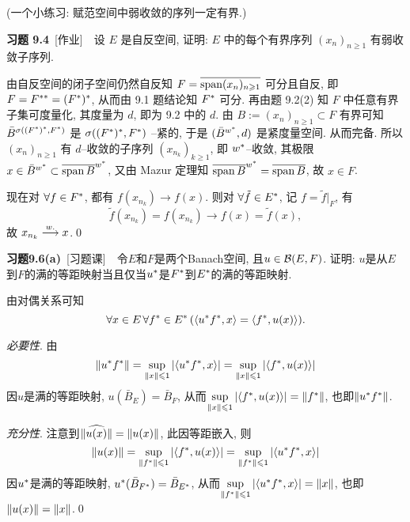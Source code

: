 	(一个小练习: 赋范空间中弱收敛的序列一定有界.)

	\textbf{习题 9.4}\ [作业]\ \ 设 $ E $ 是自反空间, 证明: $ E $ 中的每个有界序列 $ (x_{n})_{n\geqslant1} $ 有弱收敛子序列.
	\begin{Proof}
		由自反空间的闭子空间仍然自反知 $ F=\overline{\operatorname{span}(x_{n})_{n\geqslant1}} $ 可分且自反, 即 $ F=F^{**}=(F^{*})^{*} $, 从而由 9.1 题结论知 $ F^{*} $ 可分. 再由题 9.2(2) 知 $ F $ 中任意有界子集可度量化, 其度量为 $ d $, 即为 9.2 中的 $ d $. 由 $ B:=(x_{n})_{n\geqslant1}\subset F $ 有界可知 $ \bar{B}^{\sigma((F^{*})^{*}, F^{*})} $ 是 $ \sigma((F^{*})^{*}, F^{*}) $ --紧的, 于是 $ (\bar{B}^{w^{*}}, d) $ 是紧度量空间. 从而完备. 所以 $ (x_{n})_{n\geqslant1} $ 有 $ d $--收敛的子序列 $ (x_{n_{k}})_{k\geqslant1} $, 即 $ w^{*} $--收敛, 其极限 $ x\in\bar{B}^{w^{*}}\subset\overline{\operatorname{span} B}^{w^{*}} $, 又由 Mazur 定理知 $ \overline{\operatorname{span} B}^{w^{*}}=\overline{\operatorname{span} B} $, 故 $ x\in F $.

		现在对 $ \forall f\in F^{*} $, 都有 $  f(x_{n_{k}})\to f(x) $. 则对 $ \forall \tilde{f}\in E^{*} $, 记 $ f = \tilde{f}|_{F} $, 有
		\[
			\tilde{f}(x_{n_{k}})=f(x_{n_{k}})\to f(x)=\tilde{f}(x),
		\]
		故 $ x_{n_{k}}\overset{w.}{\longrightarrow} x $.\qed
	\end{Proof}
	
	\textbf{习题9.6(a)}\ [习题课]\ \ 令$ E $和$ F $是两个Banach空间, 且$ u\in\mathcal{B}(E,F) $. 证明: $ u $是从$ E $到$ F $的满的等距映射当且仅当$ u^{*} $是$ F^{*} $到$ E^{*} $的满的等距映射.
	\begin{Proof}
	由对偶关系可知
	\[
	\forall x\in E\,\forall f^{*}\in E^{*}\,(\left\langle u^{*}f^{*},x \right\rangle=\left\langle f^{*},u(x) \right\rangle).
	\]
	
	\textsl{必要性}. 由
	\[
	\left\| u^{*}f^{*} \right\|=\sup_{\left\| x \right\|\leqslant 1}\left| \left\langle u^{*}f^{*},x \right\rangle \right| =\sup_{\left\| x \right\|\leqslant 1}\left| \left\langle f^{*},u(x) \right\rangle \right| 
	\]
	因$ u $是满的等距映射, $ u(\bar{B}_E)=\bar{B}_F $, 从而$ \sup\limits_{\left\| x \right\|\leqslant 1}\left| \left\langle f^{*},u(x) \right\rangle \right| =\left\| f^{*} \right\| $, 也即$ \left\| u^{*}f^{*} \right\| $.
	
	\textsl{充分性}. 注意到$ \lVert \widehat{u(x)}\rVert=\left\| u(x) \right\| $, 此因等距嵌入, 则
	\[
	\left\| u(x) \right\|=\sup_{\left\| f^{*} \right\|\leqslant 1}\left| \left\langle f^{*},u(x) \right\rangle \right| =\sup_{\left\| f^{*} \right\|\leqslant 1}\left| \left\langle u^{*}f^{*},x \right\rangle \right| 
	\]
	因$ u^{*} $是满的等距映射, $ u^{*}(\bar{B}_{F^{*}})=\bar{B}_{E^{*}} $, 从而$ \sup\limits_{\left\| f^{*} \right\|\leqslant 1}\left| \left\langle u^{*}f^{*},x \right\rangle \right| =\left\| x \right\| $, 也即$ \left\| u(x) \right\|=\left\| x \right\| $.\qed
	\end{Proof}
	
